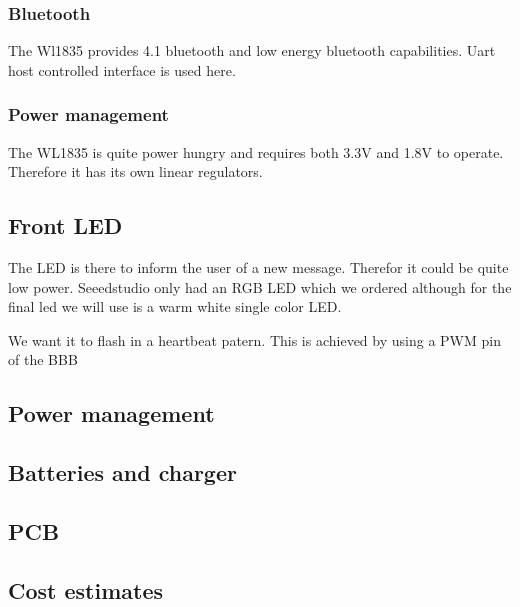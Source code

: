 \subsubsection{Bluetooth}
The Wl1835 provides 4.1 bluetooth and low energy bluetooth capabilities. Uart host controlled interface is used here.
\subsubsection{Power management}
The WL1835 is quite power hungry and requires both 3.3V and 1.8V to operate. Therefore it has its own linear regulators.
\subsection{Front LED}
The LED is there to inform the user of a new message. Therefor it could be quite low power. Seeedstudio only had an RGB LED which we ordered although for the final led we will use is a warm white single color LED.

We want it to flash in a heartbeat patern. This is achieved by using a PWM pin of the BBB
\subsection{Power management}
\subsection{Batteries and charger}
\subsection{PCB}
\subsection{Cost estimates}
